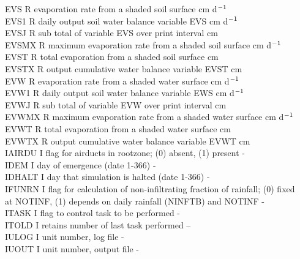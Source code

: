 \documentclass[11pt]{article}
\begin{document}
\begin{tabbing}
EVS\> \> R\> evaporation rate from a shaded soil surface\> \> \> \> \> \> \> cm d$^{{\rm -1}}$\\
EVS1\> \> R\> daily output soil water balance variable EVS\> \> \> \> \> \> \> cm d$^{{\rm -1}}$\\
EVSJ\> \> R\> sub total of variable EVS over print interval\> \> \> \> \> \> \> cm \\
EVSMX\> \> R\> maximum evaporation rate from a shaded soil surface\> \> \> \> \> \> \> cm d$^{{\rm -1}}$\\
EVST\> \> R\> total evaporation from a shaded soil surface\> \> \> \> \> \> \> cm\\
EVSTX\> \> R\> output cumulative water balance variable EVST\> \> \> \> \> \> \> cm\\
EVW\> \> R\> evaporation rate from a shaded water surface\> \> \> \> \> \> \> cm d$^{{\rm -1}}$\\
EVW1\> \> R\> daily output soil water balance variable EWS\> \> \> \> \> \> \> cm d$^{{\rm -1}}$\\
EVWJ\> \> R\> sub total of variable EVW over print interval\> \> \> \> \> \> \> cm \\
EVWMX\> \> R\> maximum evaporation rate from a shaded water surface\> \> \> \> \> \> \> cm d$^{{\rm -1}}$\\
EVWT\> \> R\> total evaporation from a shaded water surface\> \> \> \> \> \> \> cm\\
EVWTX\> \> R\> output cumulative water balance variable EVWT\> \> \> \> \> \> \> cm\\
IAIRDU\> \> I\> flag for airducts in rootzone;  (0) absent, (1) present\> \> \> \> \> \> \> -\\
IDEM\> \> I\> day of emergence (date 1-366)\> \> \> \> \> \> \> -\\
IDHALT\> \> I\> day that simulation is halted (date 1-366)\> \> \> \> \> \> \> -\\
IFUNRN\> \> I\> flag for calculation of non-infiltrating fraction of rainfall; (0) fixed\\
 \>\> \> at NOTINF, (1) depends on daily rainfall (NINFTB) and NOTINF\> \> \> \> \> \> \> -\\
ITASK\> \> I\> flag to control task to be performed\> \> \> \> \> \> \> -\\
ITOLD\> \> I\> retains number of last task performed\> \> \> \> \> \> \> --\\
IULOG\> \> I\> unit number, log file\> \> \> \> \> \> \> -\\
IUOUT\> \> I\> unit number, output file\> \> \> \> \> \> \> -\\

\end{tabbing}
\end{document}
